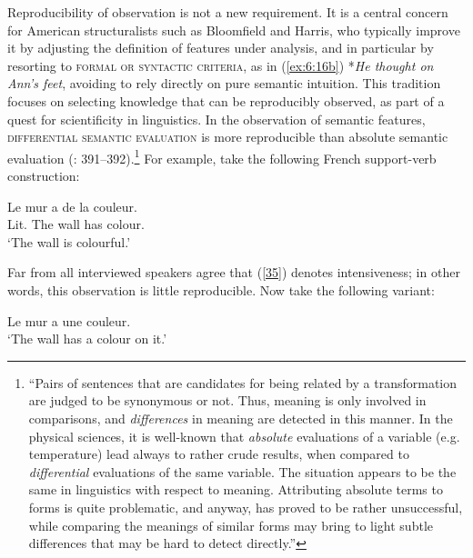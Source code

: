 \documentclass[output=paper]{langsci/langscibook}
\begin{document}
Reproducibility of observation is not a new requirement. It is a central concern for American structuralists such as Bloomfield and Harris, who typically improve 
it by adjusting the definition of features under analysis, and in particular by resorting to \textsc{formal or syntactic criteria}, as in (\ref{ex:6:16b}) *\textit{He thought on Ann’s feet}, avoiding to rely directly on pure semantic intuition. This tradition focuses on selecting knowledge that can be reproducibly observed, as part of a quest for scientificity in linguistics. In the observation of semantic features, \textsc{differential semantic evaluation} is more reproducible than absolute semantic evaluation (\citealt{Gross:75-Relation}: 391–392).\footnote{ “Pairs of sentences that are candidates for being related by a transformation are judged to be synonymous or not. Thus, meaning is only involved in comparisons, and \textit{differences} in meaning are detected in this manner. In the physical sciences, it is well-known that \textit{absolute} evaluations of a variable (e.g. temperature) lead always to rather crude results, when compared to \textit{differential} evaluations of the same variable. The situation appears to be the same in linguistics with respect to meaning. Attributing absolute terms to forms is quite problematic, and anyway, has proved to be rather unsuccessful, while comparing the meanings of similar forms may bring to light subtle differences that may be hard to detect directly.”} For example, take the following French support-verb construction:


\begin{exe}
\ex \label{35}
Le mur a de la couleur.\\
Lit. The wall has colour.\\
‘The wall is colourful.’
\end{exe}

\noindent Far from all interviewed speakers agree that (\ref{35}) denotes intensiveness; in other words, this observation is little reproducible. Now take the following variant:


\begin{exe}
\ex \label{36}
Le mur a une couleur.\\
‘The wall has a colour on it.’
\end{exe}
\end{document}
